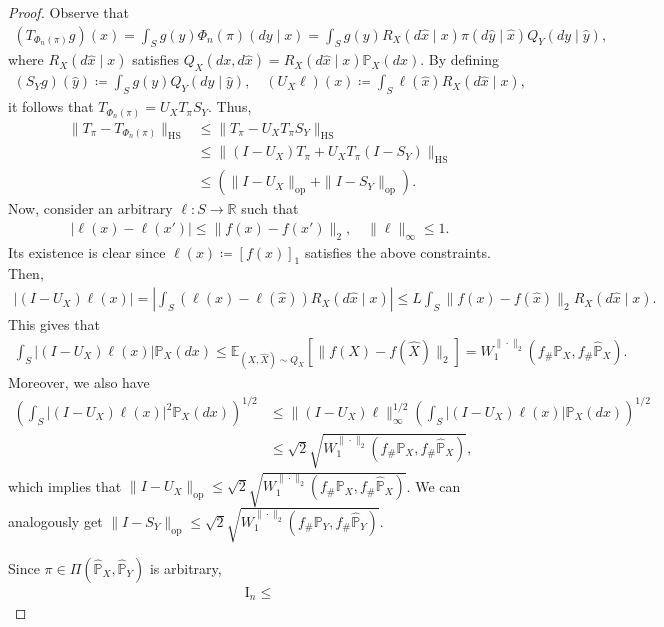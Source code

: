 \documentclass{article}
\begin{document}
\begin{proof}
	Observe that
	\begin{align*}
		(T_{\Phi_n(\pi)}g)(x) = \int_S g(y) \Phi_n(\pi)(dy \mid x) = \int_S g(y)R_X(d\hat{x} \mid x)\pi(d\hat{y} \mid \hat{x}) Q_Y(dy \mid \hat{y}),
	\end{align*}
	where $R_X(d\hat{x} \mid x)$ satisfies $Q_X(dx,d\hat{x}) = R_X(d\hat{x} \mid x)\mathbb{P}_X(dx)$. By defining
	\begin{align*}
		(S_Yg)(\hat{y}) \coloneqq \int_{S} g(y)Q_Y(dy \mid \hat{y}) , \quad (U_X\ell)(x) \coloneqq \int_S \ell(\hat{x}) R_X(d\hat{x} \mid x) ,
	\end{align*}
	it follows that $T_{\Phi_n(\pi)} = U_X T_{\pi} S_Y$. Thus,
	\begin{align*}
		\|T_{\pi} - T_{\Phi_n(\pi)}\|_{\mathrm{HS}} &\leq \|T_\pi - U_X T_\pi S_Y \|_{\mathrm{HS}} \\
		&\leq \|(I - U_X)T_\pi + U_X T_\pi (I - S_Y) \|_{\mathrm{HS}} \\
		&\leq \left(\|I - U_X\|_{\mathrm{op}} + \|I - S_Y\|_{\mathrm{op}}\right) .
	\end{align*}
	Now, consider an arbitrary $\ell: S \to \mathbb{R}$ such that
	\begin{align*}
		| \ell(x) - \ell(x') | \leq \| f(x) - f(x') \|_2 , \quad \| \ell \|_{\infty} \leq 1 .
	\end{align*}
	Its existence is clear since $\ell(x) \coloneqq [f(x)]_1$ satisfies the above constraints. Then,
	\begin{align*}
		|(I - U_X)\ell(x)| = \left\vert \int_S (\ell(x) - \ell(\hat{x})) R_X(d\hat{x} \mid x) \right\vert  \leq L\int_S \| f(x) - f(\hat{x}) \|_2 R_X(d\hat{x} \mid x) .
	\end{align*}
	This gives that
	\begin{align*}
		\int_S | (I - U_X)\ell(x) | \mathbb{P}_X(dx) \leq \mathbb{E}_{(X,\hat{X}) \sim Q_X}\left[\| f(X) - f(\hat{X}) \|_2 \right] = W_1^{\|\cdot\|_2}(f_{\#}\mathbb{P}_X,f_{\#}\hat{\mathbb{P}}_X) .
	\end{align*}
	Moreover, we also have
	\begin{align*}
		\left(\int_S | (I - U_X)\ell(x) |^2 \mathbb{P}_X(dx) \right)^{1/2} &\leq \|(I - U_X)\ell\|_{\infty}^{1/2} \left(\int_S | (I - U_X)\ell(x) | \mathbb{P}_X(dx)\right)^{1/2} \\
		&\leq \sqrt{2} \sqrt{W_1^{\|\cdot\|_2}(f_{\#}\mathbb{P}_X,f_{\#}\hat{\mathbb{P}}_X)} ,
	\end{align*}
	which implies that $\|I - U_X\|_{\mathrm{op}} \leq \sqrt{2}\sqrt{W_1^{\|\cdot\|_2}(f_{\#}\mathbb{P}_X,f_{\#}\hat{\mathbb{P}}_X)}$. We can analogously get $\|I - S_Y\|_{\mathrm{op}} \leq \sqrt{2}\sqrt{W_1^{\|\cdot\|_2}(f_{\#}\mathbb{P}_Y,f_{\#}\hat{\mathbb{P}}_Y)}$. 
	
	Since $\pi \in \Pi(\hat{\mathbb{P}}_X,\hat{\mathbb{P}}_Y)$ is arbitrary,
	\begin{align*}
		\mathrm{I}_n \leq 
	\end{align*}
\end{proof}
\end{document}
